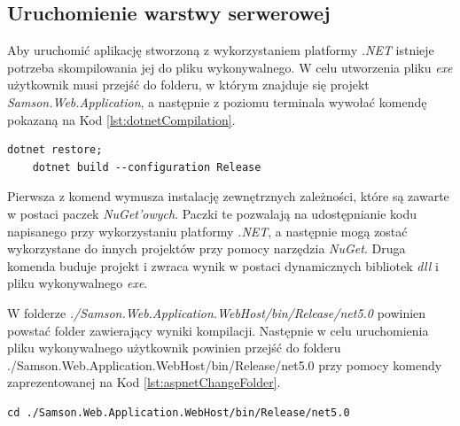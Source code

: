\documentclass[a4paper,twoside,12pt]{book}
\begin{document}
{\subsection{Uruchomienie warstwy serwerowej}
Aby uruchomić aplikację stworzoną z wykorzystaniem platformy \textit{.NET} istnieje potrzeba skompilowania jej do pliku wykonywalnego. W celu utworzenia pliku \textit{exe} użytkownik musi przejść do folderu, w którym znajduje się projekt \textit{Samson.Web.Application}, a następnie z poziomu terminala wywołać komendę pokazaną na Kod \ref{lst:dotnetCompilation}.
\begin{lstlisting}[caption={Kompilacja projektu \textit{ASP.NET}}, label={lst:dotnetCompilation}]
	dotnet restore;
	dotnet build --configuration Release
\end{lstlisting}
Pierwsza z komend wymusza instalację zewnętrznych zależności, które są zawarte w postaci paczek \textit{NuGet'owych}. Paczki te pozwalają na udostępnianie kodu napisanego przy wykorzystaniu platformy \textit{.NET}, a następnie mogą zostać wykorzystane do innych projektów przy pomocy narzędzia \textit{NuGet}. Druga komenda buduje projekt i zwraca wynik w postaci dynamicznych bibliotek \textit{dll} i pliku wykonywalnego \textit{exe}.

W folderze \textit{./Samson.Web.Application.WebHost/bin/Release/net5.0} powinien powstać folder zawierający wyniki kompilacji. Następnie w celu uruchomienia pliku wykonywalnego użytkownik powinien przejść do folderu \\ ./Samson.Web.Application.WebHost/bin/Release/net5.0 przy pomocy komendy zaprezentowanej na Kod \ref{lst:aspnetChangeFolder}.
\begin{lstlisting}[caption={Przejście do folderu zawierającego plik wykonywalny}, label={lst:aspnetChangeFolder}]
	cd ./Samson.Web.Application.WebHost/bin/Release/net5.0
\end{lstlisting}

}
\end{document}
